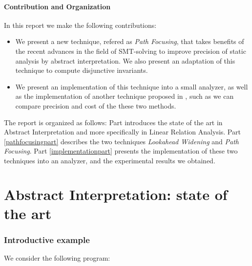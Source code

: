 \documentclass[a4paper,english,titlepage,11pt]{article}
\begin{document}
\subsection*{Contribution and Organization}

In this report we make the following contributions:
\begin{itemize}
\item We present a new technique, refered as \emph{Path Focusing}, that takes
benefits of the recent advances in the field of SMT-solving to improve precision
of static analysis by abstract interpretation. We also present an adaptation of
this technique to compute disjunctive invariants.
\item We present an implementation of this technique into a small analyzer, as
well as the implementation of another technique proposed in \cite{GopanR06},
such as we can compare precision and cost of the these two methods.
\end{itemize}

The report is organized as follows:
Part \ref{stateoftheartpart} introduces the state of the art in Abstract
Interpretation and more specifically in Linear Relation Analysis.
Part \ref{pathfocusingpart} describes the two techniques
\emph{Lookahead Widening} and \emph{Path Focusing}.
Part \ref{implementationpart} presents the implementation of these two
techniques into an analyzer, and the experimental results we obtained.

\part{Abstract Interpretation: state of the art}
\label{stateoftheartpart}

\section{Introductive example}

We consider the following program:
\end{document}
